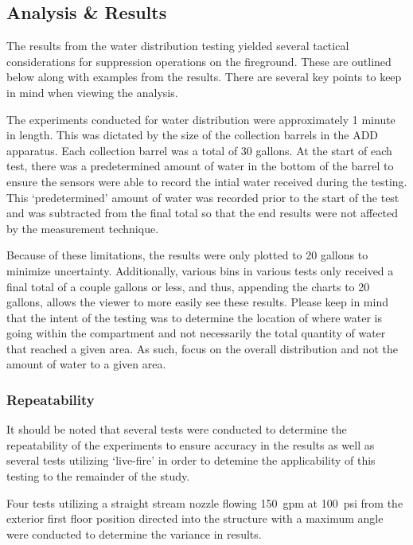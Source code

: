\documentclass{article}
\begin{document}
\clearpage

\subsection{Analysis \& Results}

The results from the water distribution testing yielded several tactical considerations for suppression operations on the fireground. These are outlined below along with examples from the results. There are several key points to keep in mind when viewing the analysis. 

The experiments conducted for water distribution were approximately 1 minute in length. This was dictated by the size of the collection barrels in the ADD apparatus. Each collection barrel was a total of 30 gallons. At the start of each test, there was a predetermined amount of water in the bottom of the barrel to ensure the sensors were able to record the intial water received during the testing. This `predetermined' amount of water was recorded prior to the start of the test and was subtracted from the final total so that the end results were not affected by the measurement technique. 

Because of these limitations, the results were only plotted to 20 gallons to minimize uncertainty. Additionally, various bins in various tests only received a final total of a couple gallons or less, and thus, appending the charts to 20 gallons, allows the viewer to more easily see these results. Please keep in mind that the intent of the testing was to determine the location of where water is going within the compartment and not necessarily the total quantity of water that reached a given area. As such, focus on the overall distribution and not the amount of water to a given area.
\subsubsection{Repeatability}

It should be noted that several tests were conducted to determine the repeatability of the experiments to ensure accuracy in the results as well as several tests utilizing `live-fire' in order to detemine the applicability of this testing to the remainder of the study.

Four tests utilizing a straight stream nozzle flowing 150~gpm at 100~psi from the exterior first floor position directed into the structure with a maximum angle were conducted to determine the variance in results.
\end{document}

